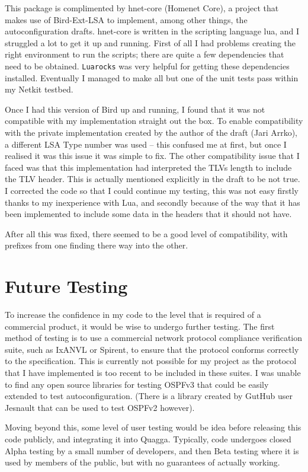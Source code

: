 \documentclass[12pt]{report}
\begin{document}
This package is complimented by hnet-core (Homenet Core), a project that makes
use of Bird-Ext-LSA to implement, among other things, the autoconfiguration
drafts\@. hnet-core is written in the scripting language lua, and I struggled a
lot to get it up and running. First of all I had problems creating the right
environment to run the scripts; there are quite a few dependencies that need to
be obtained. \texttt{Luarocks} was very helpful for getting these dependencies
installed. Eventually I managed to make all but one of the unit tests pass
within my Netkit testbed.

Once I had this version of Bird up and running, I found that it was not
compatible with my implementation straight out the box. To enable compatibility
with the private implementation created by the author of the draft (Jari Arrko),
a different LSA Type number was used -- this confused me at first, but once I
realised it was this issue it was simple to fix. The other compatibility issue
that I faced was that this implementation had interpreted the TLVs length to
include the TLV header. This is actually mentioned explicitly in the draft to
be not true. I corrected the code so that I could continue my testing, this was
not easy firstly thanks to my inexperience with Lua, and secondly because of
the way that it has been implemented to include some data in the headers that
it should not have.  

After all this was fixed, there seemed to be a good level of compatibility,
with prefixes from one finding there way into the other.

\section{Future Testing}
To increase the confidence in my code to the level that is required of a
commercial product, it would be wise to undergo further testing. The first
method of testing is to use a commercial network protocol compliance
verification suite, such as IxANVL or Spirent, to ensure that the protocol
conforms correctly to the specification. This is currently not possible for my
project as the protocol that I have implemented is too recent to be included in
these suites. I was unable to find any open source libraries for testing OSPFv3
that could be easily extended to test autoconfiguration. (There is a library
created by GutHub user Jesnault that can be used to test OSPFv2 however).

Moving beyond this, some level of user testing would be idea before releasing
this code publicly, and integrating it into Quagga. Typically, code undergoes
closed Alpha testing by a small number of developers, and then Beta testing
where it is used by members of the public, but with no guarantees of actually
working.
\end{document}
